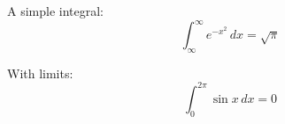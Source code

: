 \documentclass{article}
\begin{document}
A simple integral:
\[ \int_{\infty}^{\infty} e^{-x^2} \,
dx = \sqrt{\pi} \]

With limits:
\[ \int_{0}^{2\pi} \sin x \, dx = 0 \]
\end{document}
